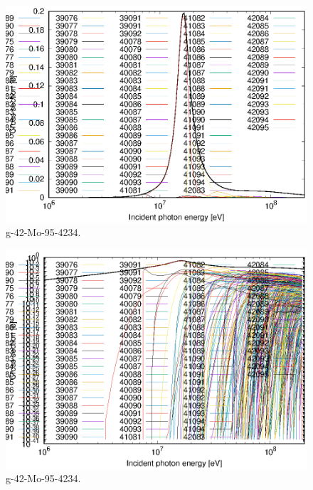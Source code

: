 \begin{figure}
 \includegraphics[width=\linewidth]{eps/g_42-Mo-95_4234.eps}
  \caption{g-42-Mo-95-4234.}
\end{figure}
\begin{figure}
 \includegraphics[width=\linewidth]{eps-log/g_42-Mo-95_4234.eps}
 \caption{g-42-Mo-95-4234.}
\end{figure}
\newpage \clearpage

